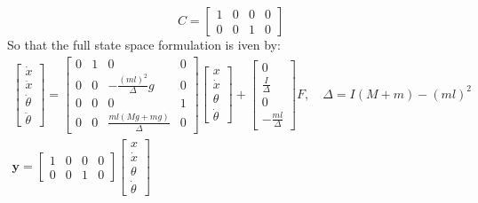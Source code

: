 $$C=\begin{bmatrix}
    1&0&0&0\\0&0&1&0
\end{bmatrix}$$
So that the full state space formulation is iven by:
\begin{gather}
    \begin{bmatrix}
    \dot x\\\ddot{x}\\\dot\theta\\\ddot{\theta}
\end{bmatrix}=\begin{bmatrix}
    0&1&0&0\\0&0&-\frac{(ml)^2}{\Delta}g&0\\
    0&0&0&1\\0&0&\frac{ml\left(Mg+mg\right)}{\Delta}&0
\end{bmatrix}\begin{bmatrix}
      x\\\dot{x}\\\theta\\\dot{\theta}
\end{bmatrix}+\begin{bmatrix}
    0\\\frac{I}{\Delta}\\0\\-\frac {ml}{\Delta}
\end{bmatrix}F,\quad\Delta=I(M+m)-(ml)^2\\
\bm{y}=\begin{bmatrix}
    1&0&0&0\\0&0&1&0
\end{bmatrix}\begin{bmatrix}
      x\\\dot{x}\\\theta\\\dot{\theta}
\end{bmatrix}
\end{gather}


